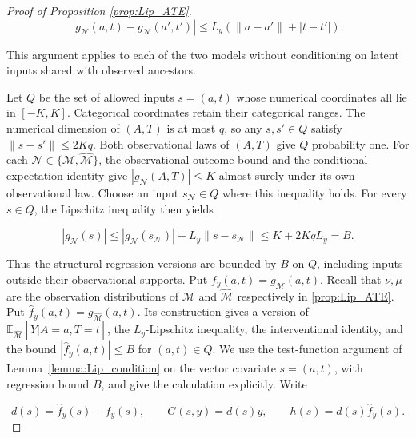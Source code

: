 \begin{proof}[Proof of Proposition \ref{prop:Lip_ATE}]
\[
|g_{\mathcal{N}}(a,t)-g_{\mathcal{N}}(a',t')|\leqslant L_y(\|a-a'\|+|t-t'|).
\]

This argument applies to each of the two models without conditioning on latent inputs shared with observed ancestors. 

Let $Q$ be the set of allowed inputs $s=(a,t)$ whose numerical coordinates all lie in $[-K,K]$. Categorical coordinates retain their categorical ranges. The numerical dimension of $(A,T)$ is at most $q$, so any $s,s'\in Q$ satisfy $\|s-s'\|\leqslant2Kq$. Both observational laws of $(A,T)$ give $Q$ probability one. For each $\mathcal{N}\in\{\mathcal{M},\hat{\mathcal{M}}\}$, the observational outcome bound and the conditional expectation identity give $|g_{\mathcal{N}}(A,T)|\leqslant K$ almost surely under its own observational law. Choose an input $s_{\mathcal{N}}\in Q$ where this inequality holds. For every $s\in Q$, the Lipschitz inequality then yields

\[
|g_{\mathcal{N}}(s)|\leqslant|g_{\mathcal{N}}(s_{\mathcal{N}})|+L_y\|s-s_{\mathcal{N}}\|\leqslant K+2KqL_y=B.
\]

Thus the structural regression versions are bounded by $B$ on $Q$, including inputs outside their observational supports. Put $f_y(a,t)=g_{\mathcal{M}}(a,t)$. Recall that $ \nu,\mu $ are the observation distributions of $\mathcal{M}$ and $\hat{\mathcal{M}}$ respectively in \cref{prop:Lip_ATE}. Put $\hat f_y(a,t)=g_{\hat{\mathcal{M}}}(a,t)$. Its construction gives a version of $\mathbb{E}_{\hat{\mathcal{M}}}[\hat Y|A=a,T=t]$, the $L_y$-Lipschitz inequality, the interventional identity, and the bound $|\hat f_y(a,t)|\leqslant B$ for $(a,t)\in Q$.  We use the test-function argument of Lemma~\ref{lemma:Lip_condition} on the vector covariate $s=(a,t)$, with regression bound $B$, and give the calculation explicitly. Write

\[
d(s)=\hat f_y(s)-f_y(s),\qquad G(s,y)=d(s)y,\qquad h(s)=d(s)\hat f_y(s).
\]


\end{proof}
